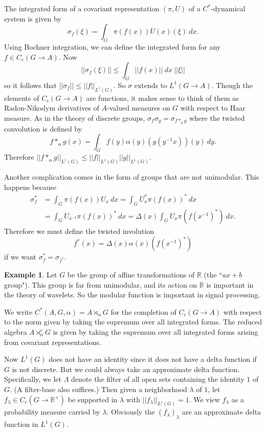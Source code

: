 \documentclass[12pt]{report}
\newcommand{\RR}{\mathbb{R}}
\theoremstyle{definition}
\newtheorem{example}[theorem]{Example}
\begin{document}
    The integrated form of a covariant representation $(\pi, U)$ of a $C^*$-dynamical system is given by
    $$\sigma_f(\xi) = \int_G \pi(f(x))U(x)(\xi) ~dx.$$
    Using Bochner integration, we can define the integrated form for any $f \in C_c(G \to A)$. Now
    $$||\sigma_f(\xi)|| \leq \int_G ||f(x)|| ~dx ~||\xi||$$
    so it follows that $||\sigma_f|| \leq ||f||_{L^1(G)}$. So $\sigma$ extends to $L^1(G \to A)$. Though the elements of $C_c(G \to A)$ are functions, it makes sense to think of them as Radon-Nikodym derivatives of $A$-valued measures on $G$ with respect to Haar measure. As in the theory of discrete groups, $\sigma_f\sigma_g = \sigma_{f*_\alpha g}$ where the twisted convolution is defined by
    $$f*_\alpha g(x) = \int_G f(y) \alpha(y)(g(y^{-1}x))(y) ~dy.$$
    Therefore $||f*_\alpha g||_{L^1(G)} \leq ||f||_{L^1(G)}||g||_{L^1(G)}$.

    Another complication comes in the form of groups that are not unimodular. This happens because
\begin{align*}
    \sigma_f^* &= \int_G \pi(f(x))U_x ~dx = \int_G U_x^* \pi(f(x))^* ~dx\\
    &= \int_G U_{x^{-1}} \pi(f(x))^* ~dx = \Delta(x) \int_G U_x\pi(f(x^{-1})^*) ~dx.
\end{align*}
    Therefore we must define the twisted involution
    $$f^*(x) = \Delta(x)\alpha(x)(f(x^{-1})^*)$$
    if we want $\sigma_f^* = \sigma_{f^*}$.
\begin{example}
    Let $G$ be the group of affine transformations of $\RR$ (the ``$ax + b$ group"). This group is far from unimodular, and its action on $\RR$ is important in the theory of wavelets. So the modular function is important in signal processing.
\end{example}
    We write $C^*(A, G, \alpha) = A \rtimes_\alpha G$ for the completion of $C_c(G \to A)$ with respect to the norm given by taking the supremum over all integrated forms. The reduced algebra $A \rtimes_\alpha^r G$ is given by taking the supremum over all integrated forms arising from covariant representations.

    Now $L^1(G)$ does not have an identity since it does not have a delta function if $G$ is not discrete. But we could always take an approximate delta function. Specifically, we let $\Lambda$ denote the filter of all open sets containing the identity $1$ of $G$. (A filter-base also suffices.) Then given a neighborhood $\lambda$ of $1$, let $f_\lambda \in C_c(G \to \RR^+)$ be supported in $\lambda$ with $||f_\lambda||_{L^1(G)} = 1$. We view $f_\lambda$ as a probability measure carried by $\lambda$. Obviously the $(f_\lambda)_\lambda$ are an approximate delta function in $L^1(G)$.
\end{document}
